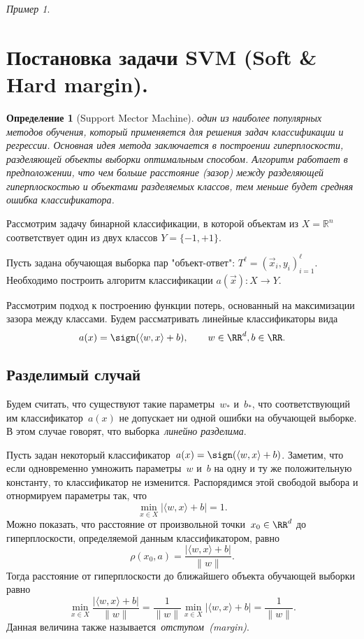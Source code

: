 \documentclass[a4paper, 12pt]{article}
\theoremstyle{plain} %
\newtheorem{definition}{Определение}
\theoremstyle{definition} %
\theoremstyle{remark} %
\newtheorem{example}{Пример}
\begin{document}
\begin{example}
\section{Постановка задачи SVM (Soft & Hard margin).}

\begin{definition}[Support Mector Machine]
	один из наиболее популярных методов обучения, который применяется для решения задач классификации и регрессии. Основная идея метода заключается в построении гиперплоскости, разделяющей объекты выборки оптимальным способом. Алгоритм работает в предположении, что чем больше расстояние (зазор) между разделяющей гиперплоскостью и объектами разделяемых классов, тем меньше будет средняя ошибка классификатора.
\end{definition}

Рассмотрим задачу бинарной классификации, в которой объектам из $X=\mathbb{R}^n$ соответствует один из двух классов $Y = \{-1, +1\}$.

Пусть задана обучающая выборка пар "объект-ответ": $T^\ell = (\vec{x}_i, y_i)_{i=1}^\ell$. Необходимо построить алгоритм классификации $a(\vec{x}) : X \to Y$.

Рассмотрим подход к построению функции потерь,
основанный на максимизации зазора между классами.
Будем рассматривать линейные классификаторы вида
\[
    a(x) = \sign (\langle w, x \rangle + b), \qquad w \in \RR^d, b \in \RR.
\]

\subsection{Разделимый случай}
Будем считать, что существуют такие параметры~$w_*$ и~$b_*$,
что соответствующий им классификатор~$a(x)$ не допускает ни одной ошибки
на обучающей выборке.
В этом случае говорят, что выборка~\emph{линейно разделима}.

Пусть задан некоторый классификатор~$a(x) = \sign (\langle w, x \rangle + b)$.
Заметим, что если одновременно умножить параметры~$w$ и~$b$
на одну и ту же положительную константу,
то классификатор не изменится.
Распорядимся этой свободой выбора и отнормируем параметры так, что
\begin{equation}
\label{eq:svmNormCond}
    \min_{x \in X} | \langle w, x \rangle + b| = 1.
\end{equation}
Можно показать, что расстояние от произвольной точки~$x_0 \in \RR^d$ до гиперплоскости,
определяемой данным классификатором, равно
\[
    \rho(x_0, a)
    =
    \frac{
        |\langle w, x \rangle + b|
    }{
        \|w\|
    }.
\]
Тогда расстояние от гиперплоскости до ближайшего объекта обучающей выборки равно
\[
    \min_{x \in X}
    \frac{
        |\langle w, x \rangle + b|
    }{
        \|w\|
    }
    =
    \frac{1}{\|w\|} \min_{x \in X} |\langle w, x \rangle + b|
    =
    \frac{1}{\|w\|}.
\]
Данная величина также называется~\emph{отступом~(margin)}.


\end{example}
\end{document}
